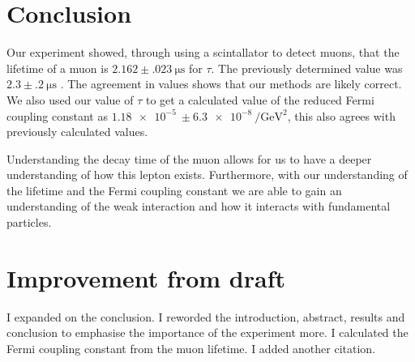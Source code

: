 \documentclass[%
 reprint,
 amsmath,amssymb,
 aps,
]{revtex4-2}
\begin{document}
\section{Conclusion}
Our experiment showed, through using a scintallator to detect muons, that the lifetime of a muon is $2.162\pm \SI{.023}{\micro\second}$ for $\tau$. The previously determined value was $2.3\pm \SI{.2}{\micro\second}$ \cite{rossi}. The agreement in values shows that our methods are likely correct. We also used our value of $\tau$ to get a calculated value of the reduced Fermi coupling constant as $\SI{1.18e-5}{}\pm\SI{6.3e-8}{\per\giga\electronvolt\squared}$, this also agrees with previously calculated values.
\par
Understanding the decay time of the muon allows for us to have a deeper understanding of how this lepton exists. Furthermore, with our understanding of the lifetime and the Fermi coupling constant we are able to gain an understanding of the weak interaction and how it interacts with fundamental particles.
\section{Improvement from draft}
I expanded on the conclusion. I reworded the introduction, abstract, results and conclusion to emphasise the importance of the experiment more. I calculated the Fermi coupling constant from the muon lifetime. I added another citation.


\end{document}
